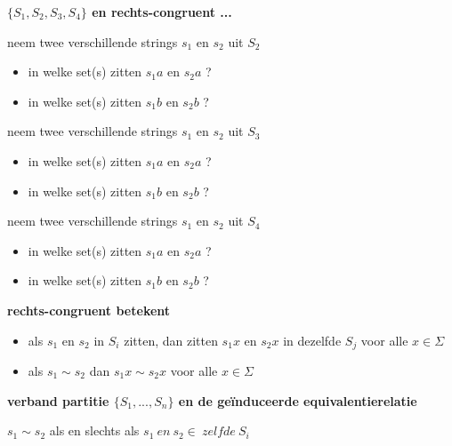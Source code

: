 \documentclass{seminar}
\newcommand{\openpagina}{}
\begin{document}
\begin{slide}
{\bf $\{S_1,S_2,S_3,S_4\}$ en rechts-congruent ...}

neem twee verschillende strings $s_1$ en $s_2$ uit $S_2$
\begin{itemize}
\item in welke set(s) zitten $s_1a$ en $s_2a$ ?
\item in welke set(s) zitten $s_1b$ en $s_2b$ ?
\end{itemize}

neem twee verschillende strings $s_1$ en $s_2$ uit $S_3$
\begin{itemize}
\item in welke set(s) zitten $s_1a$ en $s_2a$ ?
\item in welke set(s) zitten $s_1b$ en $s_2b$ ?
\end{itemize}

neem twee verschillende strings $s_1$ en $s_2$ uit $S_4$
\begin{itemize}
\item in welke set(s) zitten $s_1a$ en $s_2a$ ?
\item in welke set(s) zitten $s_1b$ en $s_2b$ ?
\end{itemize}

\end{slide} \openpagina

\begin{slide}
{\bf rechts-congruent betekent}

\begin{itemize}
\item
als $s_1$ en $s_2$ in $S_i$ zitten, dan zitten
          $s_1x$ en $s_2x$ in dezelfde $S_j$ voor alle $x \in \Sigma$

\item 
als $s_1 \sim s_2$ dan $s_1x \sim s_2x$ voor alle $x \in \Sigma$
\end{itemize}

{\bf verband partitie $\{S_1, ..., S_n\}$ en de ge\"induceerde equivalentierelatie}

$s_1 \sim s_2$ als en slechts als $s_1~en~s_2 \in~zelfde~S_i$
\end{slide} \openpagina
\end{document}
